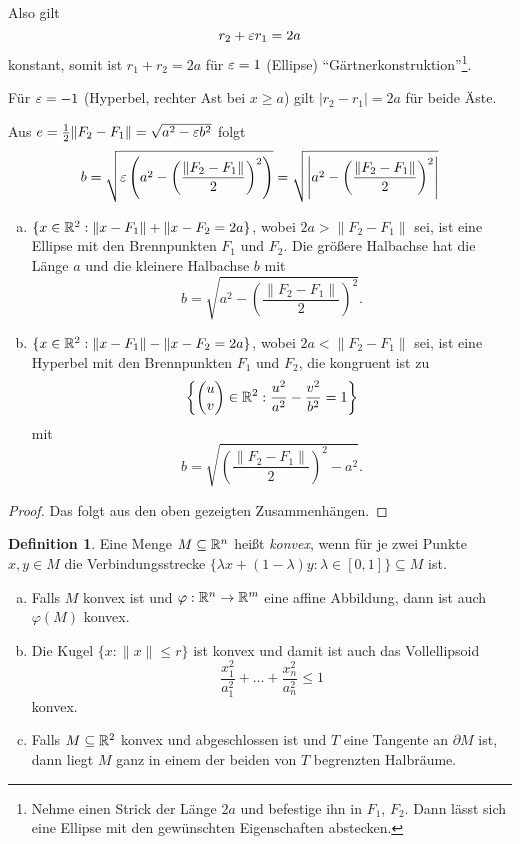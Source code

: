 \documentclass[
 a4paper,
 12pt,
 parskip=half
 ]{scrartcl}
\theoremstyle{plain}
\theoremstyle{definition}
\newtheorem*{defn*}{Definition}
\begin{document}
Also gilt
\[ r_2 + \varepsilon r_1 = 2a \]
konstant, somit ist $r_1 + r_2 = 2a$ für $\varepsilon = 1$ (Ellipse)
``Gärtnerkonstruktion''\footnote{Nehme einen Strick der Länge $2a$ und befestige
  ihn in $F_1$, $F_2$. Dann lässt sich eine Ellipse mit den gewünschten
  Eigenschaften abstecken.}.

Für $\varepsilon = -1$ (Hyperbel, rechter Ast bei $x \ge a$) gilt $|r_2 - r_1| = 2a$
für beide Äste.

\begin{bem}
  Aus $e = \frac{1}{2} \| F_2 - F_1 \| = \sqrt{a^2 - \varepsilon b^2}$ folgt
  \[ b = \sqrt{ \varepsilon \left( a^2 - \left( \frac{\| F_2 - F_1 \|}{2} \right)^2 \right) }
      = \sqrt{ \left| a^2 - \left( \frac{\| F_2 - F_1 \|}{2} \right)^2 \right| } \]
\end{bem}

\begin{prp}
  \begin{enumerate}[a)]
    \item $\{ x \in \mathbb{R}^2 : \| x - F_1 \| + \| x - F_2 = 2a \}$, wobei $2a >
      \| F_2 - F_1 \|$ sei, ist eine Ellipse mit den Brennpunkten $F_1$ und
      $F_2$. Die größere Halbachse hat die Länge $a$ und die kleinere Halbachse
      $b$ mit
      \[ b = \sqrt{a^2 - \left( \frac{\|F_2 - F_1 \|}{2} \right)^2 }. \]
    \item $\{ x \in \mathbb{R}^2 : \| x - F_1 \| - \| x - F_2 = 2a \}$, wobei $2a <
      \| F_2 - F_1 \|$ sei, ist eine Hyperbel mit den Brennpunkten $F_1$ und
      $F_2$, die kongruent ist zu
      \[ \left\{ \begin{pmatrix}u \\ v\end{pmatrix} \in \mathbb{R}^2 : \frac{u^2}{a^2} - \frac{v^2}{b^2} =
          1 \right\} \]
      mit
      \[ b = \sqrt{\left( \frac{\|F_2 - F_1 \|}{2} \right)^2 - a^2}. \]
  \end{enumerate}
\end{prp}

\begin{proof}
  Das folgt aus den oben gezeigten Zusammenhängen.
\end{proof}

\begin{defn*}
  Eine Menge $M \subseteq \mathbb{R}^n$ heißt \emph{konvex}, wenn für je zwei Punkte
  $x,y \in M$ die Verbindungsstrecke $\{ \lambda x + (1-\lambda) y : \lambda \in
  [0,1] \} \subseteq M$ ist.
\end{defn*}

\begin{kor}
  \begin{enumerate}[a)]
    \item Falls $M$ konvex ist und $\varphi: \mathbb{R}^n \to \mathbb{R}^m$ eine affine
      Abbildung, dann ist auch $\varphi(M)$ konvex.
    \item Die Kugel $\{ x : \| x \| \le r \}$ ist konvex und damit ist auch das
      Vollellipsoid
      \[ \frac{x_1^2}{a_1^2} + \ldots + \frac{x_n^2}{a_n^2} \le 1 \]
      konvex.
    \item Falls $M \subseteq \mathbb{R}^2$ konvex und abgeschlossen ist und $T$ eine
      Tangente an $\partial M$ ist, dann liegt $M$ ganz in einem der beiden von
      $T$ begrenzten Halbräume.
    \end{enumerate}
\end{kor}
\end{document}
